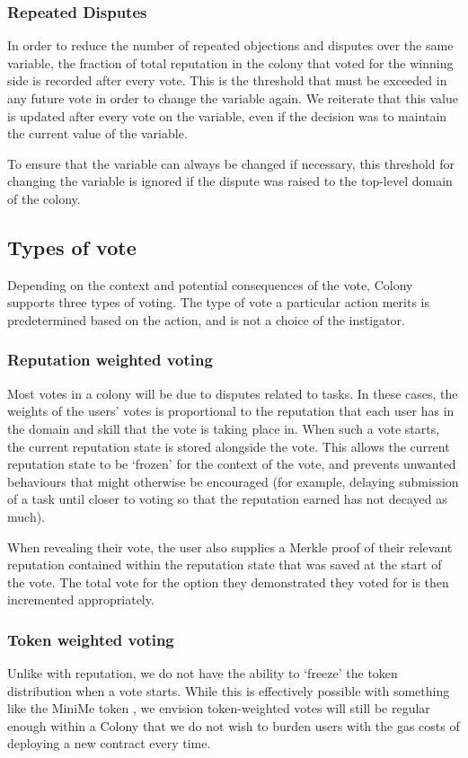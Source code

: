 \subsubsection{Repeated Disputes}\label{sec:repeated-disputes}
In order to reduce the number of repeated objections and disputes over the same variable, the fraction of total reputation in the colony that voted for the winning side is recorded after every vote. This is the threshold that must be exceeded in any future vote in order to change the variable again. We reiterate that this value is updated after every vote on the variable, even if the decision was to maintain the current value of the variable.

To ensure that the variable can always be changed if necessary, this threshold for changing the variable is ignored if the dispute was raised to the top-level domain of the colony.

\subsection{Types of vote}
Depending on the context and potential consequences of the vote, Colony supports three types of voting. The type of vote a particular action merits is predetermined based on the action, and is not a choice of the instigator.

\subsubsection{Reputation weighted voting}
Most votes in a colony will be due to disputes related to tasks. In these cases, the weights of the users' votes is proportional to the reputation that each user has in the domain and skill that the vote is taking place in. When such a vote starts, the current reputation state is stored alongside the vote. This allows the current reputation state to be `frozen' for the context of the vote, and prevents unwanted behaviours that might otherwise be encouraged (for example, delaying submission of a task until closer to voting so that the reputation earned has not decayed as much).

When revealing their vote, the user also supplies a Merkle proof of their relevant reputation contained within the reputation state that was saved at the start of the vote. The total vote for the option they demonstrated they voted for is then incremented appropriately.

\subsubsection{Token weighted voting}
Unlike with reputation, we do not have the ability to `freeze' the token distribution when a vote starts. While this is effectively possible with something like the MiniMe token \cite{minime}, we envision token-weighted votes will still be regular enough within a Colony that we do not wish to burden users with the gas costs of deploying a new contract every time.

